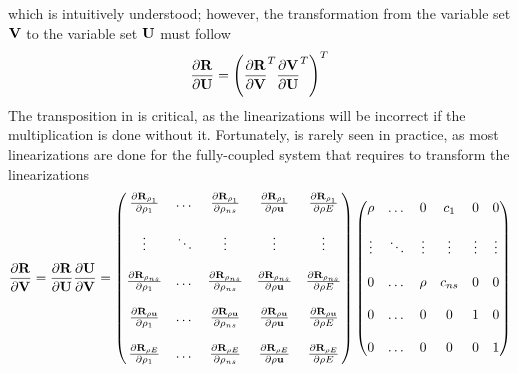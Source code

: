 \documentclass[a4paper]{report}
\begin{document}
which is intuitively understood; however, the transformation from the variable
set $\mathbf V$ to the variable set $\mathbf U$ must follow 
\begin{equation}
  \frac{\partial \mathbf R}{\partial \mathbf U} = \left( \frac{\partial \mathbf R}{\partial \mathbf V}^{T} \frac{\partial \mathbf V}{\partial \mathbf U}^{T} \right)^{T}
  \label{r-v-to-u}
\end{equation}
The transposition in  is critical, as the linearizations will be
incorrect if the multiplication is done without it.  Fortunately,
 is rarely seen in practice, as most linearizations are done for
the fully-coupled system that requires  to transform the
linearizations
\begin{equation}
  \begin{aligned}
    \frac{\partial \mathbf R}{\partial \mathbf V} = \frac{\partial \mathbf R}{\partial \mathbf U} \frac{\partial \mathbf U}{\partial \mathbf V} =
    \begin{pmatrix}
      \frac{\partial \mathbf R_{\rho_1}}{\partial \rho_1}    & \dots  & \frac{\partial \mathbf R_{\rho_1}}{\partial \rho_{ns}}    & \frac{\partial \mathbf R_{\rho_1}}{\partial \rho \mathbf u}    & \frac{\partial \mathbf R_{\rho_1}}{\partial \rho E}    \\ \\
      \vdots                    & \ddots & \vdots                       & \vdots                      & \vdots                    \\ \\
      \frac{\partial \mathbf R_{\rho_{ns}}}{\partial \rho_1} & \dots  & \frac{\partial \mathbf R_{\rho_{ns}}}{\partial \rho_{ns}} & \frac{\partial \mathbf R_{\rho_{ns}}}{\partial \rho \mathbf u} & \frac{\partial \mathbf R_{\rho_{ns}}}{\partial \rho E} \\ \\
      \frac{\partial \mathbf R_{\rho \mathbf u}}{\partial \rho_1}  & \dots  & \frac{\partial \mathbf R_{\rho \mathbf u}}{\partial \rho_{ns}}  & \frac{\partial \mathbf R_{\rho \mathbf u}}{\partial \rho \mathbf u}  & \frac{\partial \mathbf R_{\rho \mathbf u}}{\partial \rho E}  \\ \\
      \frac{\partial \mathbf R_{\rho E}}{\partial \rho_1}    & \dots  & \frac{\partial \mathbf R_{\rho E}}{\partial \rho_{ns}}    & \frac{\partial \mathbf R_{\rho E}}{\partial \rho \mathbf u}    & \frac{\partial \mathbf R_{\rho E}}{\partial \rho E}
    \end{pmatrix}
    \begin{pmatrix}
      \rho   & \dots  & 0      & c_1     & 0      & 0      \\ \\
      \vdots & \ddots & \vdots & \vdots  & \vdots & \vdots \\ \\
      0      & \dots  &\rho    & c_{ns}  & 0      & 0      \\ \\
      0      & \dots  &0       & 0       & 1      & 0      \\ \\
      0      & \dots  &0       & 0       & 0      & 1
    \end{pmatrix}
  \end{aligned}
  \label{drdu-to-drdv}
\end{equation}
\end{document}

